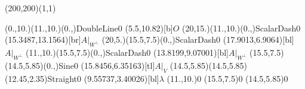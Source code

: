 \unitlength=1bp%

\begin{feynartspicture}(200,200)(1,1)

\FADiagram{}
\FAProp(0.,10.)(11.,10.)(0.,){DoubleLine}{0}
\FALabel(5.5,10.82)[b]{$O$}
\FAProp(20,15.)(11.,10.)(0.,){ScalarDash}{0}
\FALabel(15.3487,13.1564)[br]{$A|_{W^\perp}$}
\FAProp(20,5.)(15.5,7.5)(0.,){ScalarDash}{0}
\FALabel(17.9013,6.9064)[bl]{$A|_{W^\perp}$}
\FAProp(11.,10.)(15.5,7.5)(0.,){ScalarDash}{0}
\FALabel(13.8199,9.07001)[bl]{$A|_{W^\perp}$}
\FAProp(15.5,7.5)(14.5,5.85)(0.,){Sine}{0}
\FALabel(15.8456,6.35163)[tl]{$A|_V$}
\FAProp(14.5,5.85)(14.5,5.85)(12.45,2.35){Straight}{0}
\FALabel(9.55737,3.40026)[bl]{$\lambda$}
\FAVert(11.,10.){0}
\FAVert(15.5,7.5){0}
\FAVert(14.5,5.85){0}
\end{feynartspicture}

